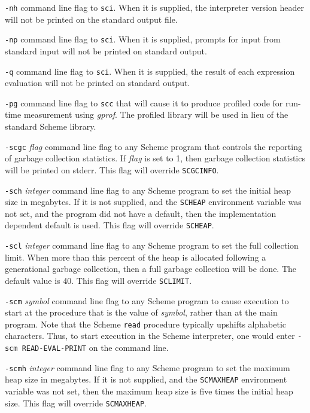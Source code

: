 \documentclass[10pt,twocolumn]{article}
\begin{document}
\texttt{-nh} command line flag to \texttt{sci}.  When it is supplied,
the interpreter version header will not be printed on the standard
output file.

\texttt{-np} command line flag to \texttt{sci}.  When it is supplied,
prompts for input from standard input will not be printed on standard
output.

\texttt{-q} command line flag to \texttt{sci}.  When it is supplied,
the result of each expression evaluation will not be printed on
standard output.

\texttt{-pg} command line flag to \texttt{scc} that will cause it to
produce profiled code for run-time measurement using \emph{gprof}.
The profiled library will be used in lieu of the standard Scheme
library.

\texttt{-scgc} \emph{flag} command line flag to any Scheme program
that controls the reporting of garbage collection statistics.  If
\emph{flag} is set to 1, then garbage collection statistics will be
printed on stderr.  This flag will override \texttt{SCGCINFO}.

\texttt{-sch} \emph{integer} command line flag to any Scheme program
to set the initial heap size in megabytes.  If it is not supplied, and
the \texttt{SCHEAP} environment variable was not set, and the program
did not have a default, then the implementation dependent default is
used.  This flag will override \texttt{SCHEAP}.

\texttt{-scl} \emph{integer} command line flag to any Scheme program
to set the full collection limit.  When more than this percent of the
heap is allocated following a generational garbage collection, then a
full garbage collection will be done.  The default value is 40.  This
flag will override \texttt{SCLIMIT}.

\texttt{-scm} \emph{symbol} command line flag to any Scheme program to
cause execution to start at the procedure that is the value of
\emph{symbol}, rather than at the main program.  Note that the Scheme
\texttt{read} procedure typically upshifts alphabetic characters.
Thus, to start execution in the Scheme interpreter, one would enter
\texttt{-scm READ-EVAL-PRINT} on the command line.

\texttt{-scmh} \emph{integer} command line flag to any Scheme program
to set the maximum heap size in megabytes.  If it is not supplied, and
the \texttt{SCMAXHEAP} environment variable was not set, then the
maximum heap size is five times the initial heap size. This flag will
override \texttt{SCMAXHEAP}.
\end{document}
